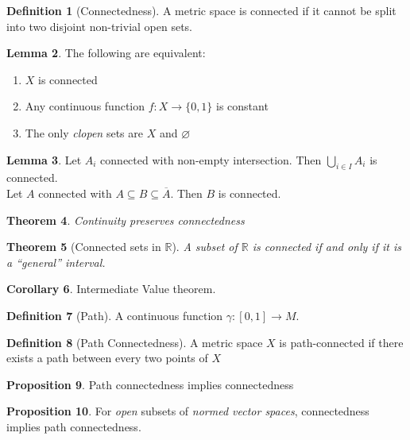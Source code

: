 \documentclass[11pt,a4paper, titlepage]{article}
\newtheorem{theorem}{Theorem}[section]
\theoremstyle{definition}
\newtheorem{definition}[theorem]{Definition}
\newtheorem{corollary}[theorem]{Corollary}
\newtheorem{lemma}[theorem]{Lemma}
\newtheorem{proposition}[theorem]{Proposition}
\begin{document}
\begin{definition}[Connectedness]
A metric space is connected if it cannot be split into two disjoint non-trivial open sets.
\end{definition}

\begin{lemma}
The following are equivalent:
\begin{enumerate}
	\item $X$ is connected
	\item Any continuous function $f \colon X \longrightarrow \{0,1\}$ is constant
	\item The only \emph{clopen} sets are $X$ and $\varnothing$
\end{enumerate}
\end{lemma}

\begin{lemma}
Let $A_i$ connected with non-empty intersection. Then $\bigcup_{i \in I} A_i$ is connected. \\
Let $A$ connected with $A \subseteq B \subseteq \overline{A}$. Then $B$ is connected.
\end{lemma}

\begin{theorem}
Continuity preserves connectedness
\end{theorem}

\begin{theorem}[Connected sets in $\mathbb{R}$]
A subset of $\mathbb{R}$ is connected if and only if it is a ``general'' interval.
\end{theorem}

\begin{corollary}
Intermediate Value theorem.
\end{corollary}

\begin{definition}[Path]
A continuous function $\gamma \colon [0,1] \longrightarrow M$.
\end{definition}

\begin{definition}[Path Connectedness]
A metric space $X$ is path-connected if there exists a path between every two points of $X$
\end{definition}

\begin{proposition}
Path connectedness implies connectedness
\end{proposition}

\begin{proposition}
For \emph{open} subsets of \emph{normed vector spaces}, connectedness implies path connectedness.
\end{proposition}
\end{document}
